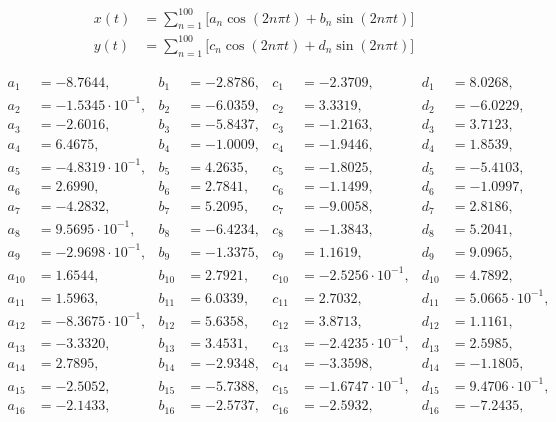 \begin{align*}
x(t) &= \sum\limits_{n=1}^{ 100 } \Big[a_n \cos(2n\pi t) + b_n \sin(2n\pi t) \Big]\\ 
y(t) &= \sum\limits_{n=1}^{ 100 } \Big[c_n \cos(2n\pi t) + d_n \sin(2n\pi t) \Big]
\end{align*}

\begin{align*}
  a_{ 1 } &= -8.7644, & b_{ 1 } &= -2.8786, & c_{ 1 } &= -2.3709, & d_{ 1 } &= 8.0268, \\ 
  a_{ 2 } &= -1.5345 \cdot 10^{ -1 }, & b_{ 2 } &= -6.0359, & c_{ 2 } &= 3.3319, & d_{ 2 } &= -6.0229, \\ 
  a_{ 3 } &= -2.6016, & b_{ 3 } &= -5.8437, & c_{ 3 } &= -1.2163, & d_{ 3 } &= 3.7123, \\ 
  a_{ 4 } &= 6.4675, & b_{ 4 } &= -1.0009, & c_{ 4 } &= -1.9446, & d_{ 4 } &= 1.8539, \\ 
  a_{ 5 } &= -4.8319 \cdot 10^{ -1 }, & b_{ 5 } &= 4.2635, & c_{ 5 } &= -1.8025, & d_{ 5 } &= -5.4103, \\ 
  a_{ 6 } &= 2.6990, & b_{ 6 } &= 2.7841, & c_{ 6 } &= -1.1499, & d_{ 6 } &= -1.0997, \\ 
  a_{ 7 } &= -4.2832, & b_{ 7 } &= 5.2095, & c_{ 7 } &= -9.0058, & d_{ 7 } &= 2.8186, \\ 
  a_{ 8 } &= 9.5695 \cdot 10^{ -1 }, & b_{ 8 } &= -6.4234, & c_{ 8 } &= -1.3843, & d_{ 8 } &= 5.2041, \\ 
  a_{ 9 } &= -2.9698 \cdot 10^{ -1 }, & b_{ 9 } &= -1.3375, & c_{ 9 } &= 1.1619, & d_{ 9 } &= 9.0965, \\ 
  a_{ 10 } &= 1.6544, & b_{ 10 } &= 2.7921, & c_{ 10 } &= -2.5256 \cdot 10^{ -1 }, & d_{ 10 } &= 4.7892, \\ 
  a_{ 11 } &= 1.5963, & b_{ 11 } &= 6.0339, & c_{ 11 } &= 2.7032, & d_{ 11 } &= 5.0665 \cdot 10^{ -1 }, \\ 
  a_{ 12 } &= -8.3675 \cdot 10^{ -1 }, & b_{ 12 } &= 5.6358, & c_{ 12 } &= 3.8713, & d_{ 12 } &= 1.1161, \\ 
  a_{ 13 } &= -3.3320, & b_{ 13 } &= 3.4531, & c_{ 13 } &= -2.4235 \cdot 10^{ -1 }, & d_{ 13 } &= 2.5985, \\ 
  a_{ 14 } &= 2.7895, & b_{ 14 } &= -2.9348, & c_{ 14 } &= -3.3598, & d_{ 14 } &= -1.1805, \\ 
  a_{ 15 } &= -2.5052, & b_{ 15 } &= -5.7388, & c_{ 15 } &= -1.6747 \cdot 10^{ -1 }, & d_{ 15 } &= 9.4706 \cdot 10^{ -1 }, \\ 
  a_{ 16 } &= -2.1433, & b_{ 16 } &= -2.5737, & c_{ 16 } &= -2.5932, & d_{ 16 } &= -7.2435, \\ 

\end{align*}
